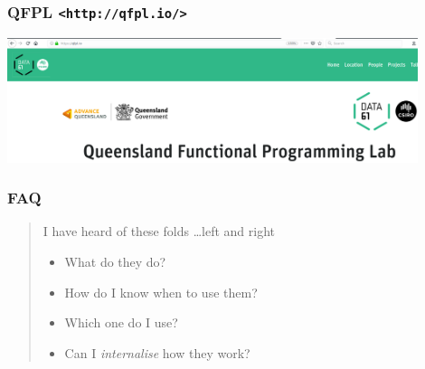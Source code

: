\begin{frame}
\frametitle{QFPL \lstinline{<http://qfpl.io/>}}
\begin{center}
\includegraphics[width=0.9\textwidth]{image/qfpl_io.png}
\end{center}
\end{frame}

\begin{frame}
\frametitle{FAQ}
\begin{quote}
I have heard of these folds \ldots left and right
\begin{itemize}
\item What do they do?
\item How do I know when to use them?
\item Which one do I use?
\item Can I \emph{internalise} how they work?
\end{itemize}
\end{quote}
\end{frame}
